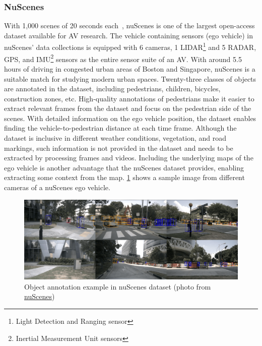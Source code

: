 \subsubsection{NuScenes}
With 1,000 scenes of 20 seconds each~\cite{nuscenes2019}, nuScenes is one of the largest open-access dataset available for AV research. The vehicle containing sensors (ego vehicle) in nuScenes' data collections is equipped with 6 cameras, 1 LIDAR\footnote{Light Detection and Ranging sensor} and 5 RADAR, GPS, and IMU\footnote{Inertial Measurement Unit sensors} sensors as the entire sensor suite of an AV. With around 5.5 hours of driving in congested urban areas of Boston and Singapore, nuScenes is a suitable match for studying modern urban spaces. Twenty-three classes of objects are annotated in the dataset, including pedestrians, children, bicycles, construction zones, etc. High-quality annotations of pedestrians make it easier to extract relevant frames from the dataset and focus on the pedestrian side of the scenes. With detailed information on the ego vehicle position, the dataset enables finding the vehicle-to-pedestrian distance at each time frame. Although the dataset is inclusive in different weather conditions, vegetation, and road markings, such information is not provided in the dataset and needs to be extracted by processing frames and videos. Including the underlying maps of the ego vehicle is another advantage that the nuScenes dataset provides, enabling extracting some context from the map. \cref{fig:nusc} shows a sample image from different cameras of a nuScenes ego vehicle.
\begin{figure}
    \centering
    \includegraphics[scale=0.2]{chapter_6/figures/nusc.png}
    \caption{Object annotation example in nuScenes dataset (photo from \href{https://www.nuscenes.org/}{nuScenes})}
    \label{fig:nusc}
\end{figure}

